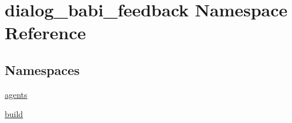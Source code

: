 \hypertarget{namespacedialog__babi__feedback}{}\section{dialog\+\_\+babi\+\_\+feedback Namespace Reference}
\label{namespacedialog__babi__feedback}
\subsection*{Namespaces}
\begin{DoxyCompactItemize}
\item 
 \hyperlink{namespacedialog__babi__feedback_1_1agents}{agents}
\item 
 \hyperlink{namespacedialog__babi__feedback_1_1build}{build}
\end{DoxyCompactItemize}

